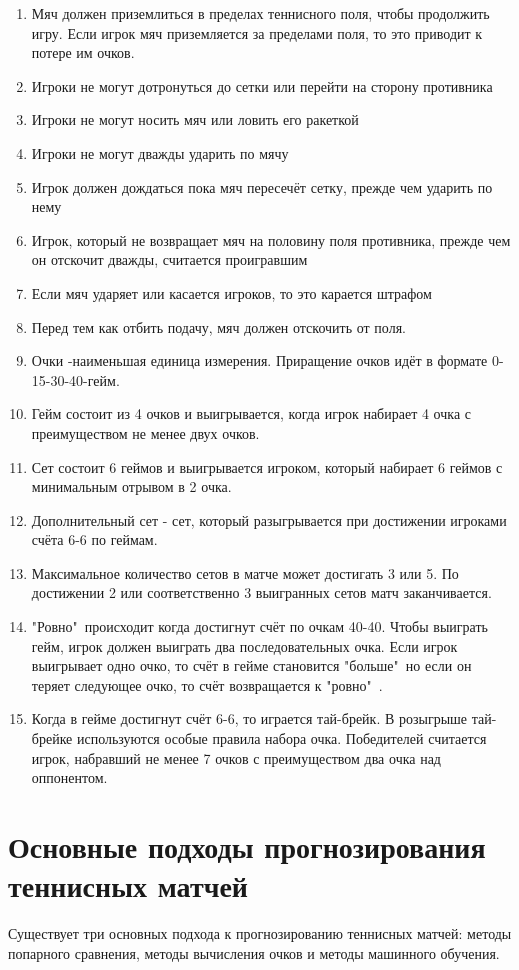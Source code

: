  \begin{enumerate}
	\item  Мяч должен приземлиться в пределах теннисного поля, чтобы продолжить игру. Если игрок мяч приземляется за пределами поля, то это приводит к потере им очков.
	\item Игроки не могут дотронуться до сетки или перейти на сторону противника
	\item Игроки не могут носить мяч или ловить его ракеткой
	\item Игроки не могут дважды ударить по мячу
    \item Игрок должен дождаться пока мяч пересечёт сетку, прежде чем ударить по нему
    \item Игрок, который не возвращает мяч на половину поля противника, прежде чем он отскочит дважды, считается проигравшим
    \item Если мяч ударяет или касается игроков, то это карается штрафом
    \item Перед тем как отбить подачу, мяч должен отскочить от поля.
    \item Очки -наименьшая единица измерения. Приращение очков идёт в формате 0-15-30-40-гейм.
    \item Гейм состоит из 4 очков и выигрывается, когда игрок набирает 4 очка с преимуществом не менее двух очков.
    \item Сет состоит 6 геймов и выигрывается игроком, который набирает 6 геймов 
 	 с минимальным отрывом в 2 очка.
 	 \item Дополнительный сет - сет, который разыгрывается при достижении игроками счёта 6-6 по геймам. 
  	\item Максимальное количество сетов в матче может достигать 3 или 5. По достижении 2 или соответственно 3 выигранных сетов матч заканчивается.
  	\item "Ровно"\ происходит когда достигнут счёт по очкам 40-40. Чтобы выиграть гейм, игрок должен выиграть два последовательных очка. Если игрок выигрывает одно очко, то счёт в гейме становится "больше"\, но если он теряет следующее очко, то счёт возвращается к "ровно"\ .
  	\item Когда в гейме достигнут счёт 6-6, то играется тай-брейк. В розыгрыше тай-брейке используются особые правила набора очка. Победителей считается игрок, набравший не менее 7 очков с преимуществом два очка над оппонентом.
\end{enumerate}
\section{Основные подходы прогнозирования теннисных матчей}
Существует три основных подхода к прогнозированию теннисных матчей: методы попарного сравнения, методы вычисления очков и методы машинного обучения.
